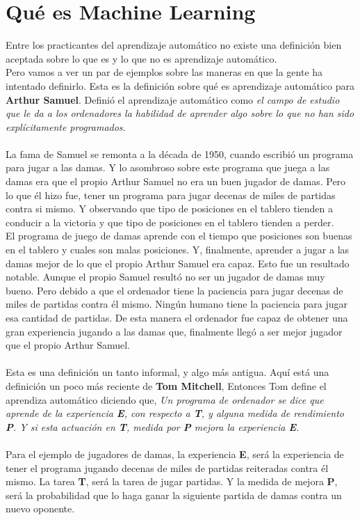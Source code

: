 \documentclass{book}
\begin{document}
\section{Qué es Machine Learning}
Entre los practicantes del aprendizaje
automático no existe una definición bien aceptada sobre lo que es y lo que no es aprendizaje automático.\\
Pero vamos a ver un par de ejemplos sobre las maneras en
que la gente ha intentado definirlo. Esta es la definición sobre qué es aprendizaje automático para
\textbf{Arthur Samuel}. Definió el aprendizaje automático como \textit{el campo de estudio que le da a los ordenadores la habilidad de aprender algo sobre lo que no han sido explícitamente programados.}\\\\ La fama de Samuel se remonta a la década
de 1950, cuando escribió un programa para jugar a las damas.
Y lo asombroso sobre este programa que juega a las damas era que el propio Arthur Samuel
no era un buen jugador de damas. Pero lo que él hizo fue, tener un programa para jugar
decenas de miles de partidas contra si mismo. Y observando que tipo de posiciones en el tablero
tienden a conducir a la victoria y que tipo de posiciones en el tablero tienden a
perder.\\ El programa de juego de damas aprende con el tiempo que posiciones son buenas
en el tablero y cuales son malas posiciones. Y, finalmente, aprender a jugar
a las damas mejor de lo que el propio Arthur Samuel era capaz. Esto fue un resultado notable.
Aunque el propio Samuel resultó no ser un jugador de damas muy bueno. Pero debido a que el
ordenador tiene la paciencia para jugar decenas de miles de partidas contra él mismo. Ningún
humano tiene la paciencia para jugar esa cantidad de partidas. De esta manera el ordenador fue capaz de
obtener una gran experiencia jugando a las damas que, finalmente llegó a ser
mejor jugador que el propio Arthur Samuel.\\\\ Esta es una definición
un tanto informal, y algo más antigua. Aquí está una definición un poco más reciente de\textbf{ Tom
Mitchell}, Entonces Tom define el aprendiza automático
diciendo que, \textit{Un programa de ordenador se dice que aprende de la experiencia\textbf{ E}, con respecto a \textbf{T}, y alguna
medida de rendimiento\textbf{ P}. Y si esta actuación en\textbf{ T}, medida por \textbf{P} mejora
la experiencia\textbf{ E}.}\\\\
Para el ejemplo de jugadores de damas, la experiencia \textbf{E}, será la
experiencia de tener el programa jugando decenas de miles de partidas reiteradas contra él mismo.
La tarea \textbf{T}, será la tarea de jugar partidas. Y la medida de mejora \textbf{P},
será la probabilidad que lo haga ganar la siguiente partida de damas contra
un nuevo oponente.
\end{document}
